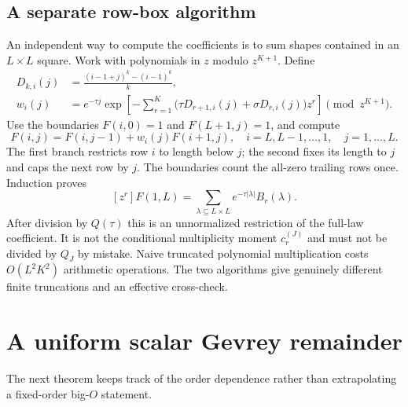\documentclass[11pt,letterpaper]{article}
\numberwithin{equation}{section}
\theoremstyle{remark}\newtheorem{remark}[theorem]{Remark}
\begin{document}
\subsection{A separate row-box algorithm}\label{pwd:dg:sec:rowbox}
An independent way to compute the coefficients is to sum shapes contained in an $L\times L$ square. Work with polynomials in $z$ modulo $z^{K+1}$. Define
\begin{align}
 D_{k,i}(j)&=\frac{(i-1+j)^k-(i-1)^k}{k},\nonumber\\
 w_i(j)&=e^{-\tau j}\exp\left[-\sum_{r=1}^K
      \bigl(\tau D_{r+1,i}(j)+\sigma D_{r,i}(j)\bigr)z^r\right]\pmod {z^{K+1}}.
 \label{pwd:dg:eq:rowweight}
\end{align}
Use the boundaries $F(i,0)=1$ and $F(L+1,j)=1$, and compute
\begin{equation}\label{pwd:dg:eq:rowbox}
 F(i,j)=F(i,j-1)+w_i(j)F(i+1,j),
 \quad i=L,L-1,\ldots,1,\quad j=1,\ldots,L.
\end{equation}
The first branch restricts row $i$ to length below $j$; the second fixes its length to $j$ and caps the next row by $j$. The boundaries count the all-zero trailing rows once. Induction proves
\begin{equation}\label{pwd:dg:eq:rowboxsum}
 [z^r]F(1,L)=\sum_{\lambda\subseteq L\times L}e^{-\tau|\lambda|}B_r(\lambda).
\end{equation}
After division by $Q(\tau)$ this is an unnormalized restriction of the full-law coefficient. It is not the conditional multiplicity moment $c_r^{(J)}$ and must not be divided by $Q_J$ by mistake. Naive truncated polynomial multiplication costs $O(L^2K^2)$ arithmetic operations. The two algorithms give genuinely different finite truncations and an effective cross-check.

\section{A uniform scalar Gevrey remainder}\label{pwd:dg:sec:gevrey}
The next theorem keeps track of the order dependence rather than extrapolating a fixed-order big-$O$ statement.
\end{document}
